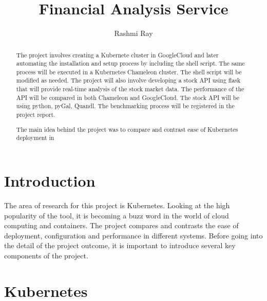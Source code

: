 
\title{Financial Analysis Service}

\author{Rashmi Ray}

\renewcommand{\shortauthors}{Rashmi Ray}

\begin{abstract}
The project involves creating a Kubernete cluster in GoogleCloud and later 
automating the installation and setup process by including the shell script.
The same process will be executed in a Kubernetes Chameleon cluster. The shell
script will be modified as needed. The project will also involve developing a 
stock API using flask that will provide real-time analysis of the stock market 
data. The performance of the API will be compared in both Chameleon and 
GoogleCloud. The stock API will be using python, pyGal, Quandl. The 
benchmarking process will be registered in the project report. 

The main idea behind the project was to compare and contrast ease of 
Kubernetes deployment in 

\end{abstract}



\maketitle

\section{Introduction}

The area of research for this project is Kubernetes. Looking at the
high popularity of the tool, it is becoming a buzz word in the world
of cloud computing and containers. The project compares and contrasts
the ease of deployment, configuration and performance in different
systems. Before going into the detail of the project outcome, it is
important to introduce several key components of the project.

\section{Kubernetes}

